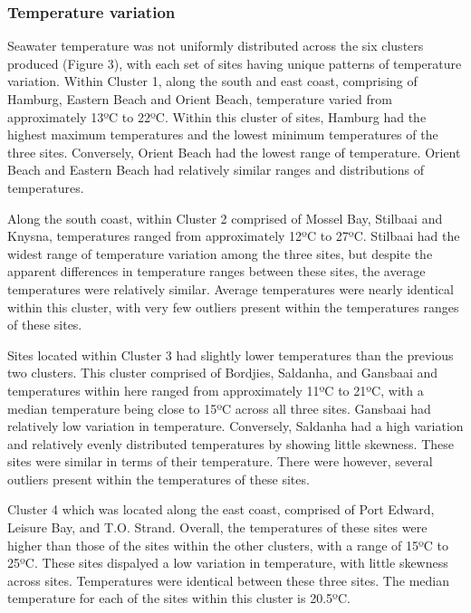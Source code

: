 \documentclass[10pt,a4paper,]{article}
\begin{document}
\hypertarget{temperature-variation}{%
\subsubsection{Temperature variation}\label{temperature-variation}}

Seawater temperature was not uniformly distributed across the six
clusters produced (Figure 3), with each set of sites having unique
patterns of temperature variation. Within Cluster 1, along the south and
east coast, comprising of Hamburg, Eastern Beach and Orient Beach,
temperature varied from approximately 13ºC to 22ºC. Within this cluster
of sites, Hamburg had the highest maximum temperatures and the lowest
minimum temperatures of the three sites. Conversely, Orient Beach had
the lowest range of temperature. Orient Beach and Eastern Beach had
relatively similar ranges and distributions of temperatures.

Along the south coast, within Cluster 2 comprised of Mossel Bay,
Stilbaai and Knysna, temperatures ranged from approximately 12ºC to
27ºC. Stilbaai had the widest range of temperature variation among the
three sites, but despite the apparent differences in temperature ranges
between these sites, the average temperatures were relatively similar.
Average temperatures were nearly identical within this cluster, with
very few outliers present within the temperatures ranges of these sites.

Sites located within Cluster 3 had slightly lower temperatures than the
previous two clusters. This cluster comprised of Bordjies, Saldanha, and
Gansbaai and temperatures within here ranged from approximately 11ºC to
21ºC, with a median temperature being close to 15ºC across all three
sites. Gansbaai had relatively low variation in temperature. Conversely,
Saldanha had a high variation and relatively evenly distributed
temperatures by showing little skewness. These sites were similar in
terms of their temperature. There were however, several outliers present
within the temperatures of these sites.

Cluster 4 which was located along the east coast, comprised of Port
Edward, Leisure Bay, and T.O. Strand. Overall, the temperatures of these
sites were higher than those of the sites within the other clusters,
with a range of 15ºC to 25ºC. These sites dispalyed a low variation in
temperature, with little skewness across sites. Temperatures were
identical between these three sites. The median temperature for each of
the sites within this cluster is 20.5ºC.
\end{document}
